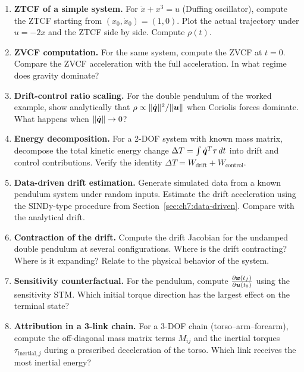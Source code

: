 \begin{enumerate}
\item \textbf{ZTCF of a simple system.}
      For $\ddot{x} + x^3 = u$ (Duffing oscillator), compute the ZTCF starting from
      $(x_0, \dot{x}_0) = (1, 0)$. Plot the actual trajectory under $u = -2x$ and the
      ZTCF side by side. Compute $\rho(t)$.

\item \textbf{ZVCF computation.}
      For the same system, compute the ZVCF at $t = 0$. Compare the ZVCF acceleration
      with the full acceleration. In what regime does gravity dominate?

\item \textbf{Drift-control ratio scaling.}
      For the double pendulum of the worked example, show analytically that $\rho \propto
      \|\dot{\bm{q}}\|^2 / \|\bm{u}\|$ when Coriolis forces dominate. What happens when $\|\dot{\bm{q}}\|
      \to 0$?

\item \textbf{Energy decomposition.}
      For a 2-DOF system with known mass matrix, decompose the total kinetic energy change
      $\Delta T = \int \dot{\bm{q}}^T \tau\,dt$ into drift and control contributions. Verify the
      identity $\Delta T = W_{\text{drift}} + W_{\text{control}}$.

\item \textbf{Data-driven drift estimation.}
      Generate simulated data from a known pendulum system under random inputs. Estimate
      the drift acceleration using the SINDy-type procedure from Section~\ref{sec:ch7:data-driven}.
      Compare with the analytical drift.

\item \textbf{Contraction of the drift.}
      Compute the drift Jacobian for the undamped double pendulum at several configurations.
      Where is the drift contracting? Where is it expanding? Relate to the physical
      behavior of the system.

\item \textbf{Sensitivity counterfactual.}
      For the pendulum, compute $\frac{\partial \bm{x}(t_f)}{\partial \bm{u}(t_0)}$ using the
      sensitivity STM. Which initial torque direction has the largest effect on the
      terminal state?

\item \textbf{Attribution in a 3-link chain.}
      For a 3-DOF chain (torso--arm--forearm), compute the off-diagonal mass matrix terms
      $M_{ij}$ and the inertial torques $\tau_{\text{inertial}, j}$ during a prescribed
      deceleration of the torso. Which link receives the most inertial energy?
\end{enumerate}
